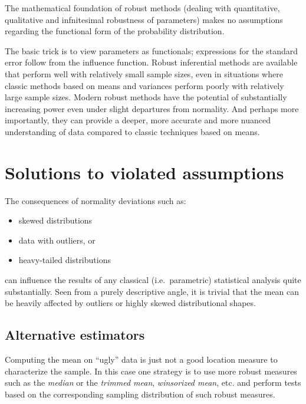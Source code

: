 \documentclass[
]{article}
\providecommand{\tightlist}{%
  \setlength{\itemsep}{0pt}\setlength{\parskip}{0pt}}
\begin{document}
The mathematical foundation of robust methods (dealing with quantitative, qualitative and infnitesimal robustness of parameters) makes no assumptions regarding the functional form of the probability distribution.

The basic trick is to view parameters as functionals; expressions for the standard error follow from the influence function. Robust inferential methods are available that perform well with relatively small sample sizes, even in situations where classic methods based on means and variances perform poorly with relatively large sample sizes. Modern robust methods have the potential of substantially increasing power even under slight departures from normality. And perhaps more importantly, they can provide a deeper, more accurate and more nuanced understanding of data compared to classic techniques based on means.

\section*{Solutions to violated assumptions}\label{solutions-to-violated-assumptions}

The consequences of normality deviations such as:

\begin{itemize}
\tightlist
\item
  skewed distributions
\item
  data with outliers, or
\item
  heavy-tailed distributions
\end{itemize}

can influence the results of any classical (i.e.~parametric) statistical analysis quite substantially. Seen from a purely descriptive angle, it is trivial that the mean can be heavily affected by outliers or highly skewed distributional shapes.

\subsection*{Alternative estimators}\label{alternative-estimators}

Computing the mean on ``ugly'' data is just not a good location measure to characterize the sample. In this case one strategy is to use more robust measures such as the \emph{median} or the \emph{trimmed mean}, \emph{winsorized mean}, etc. and perform tests based on the corresponding sampling distribution of such robust measures.
\end{document}
